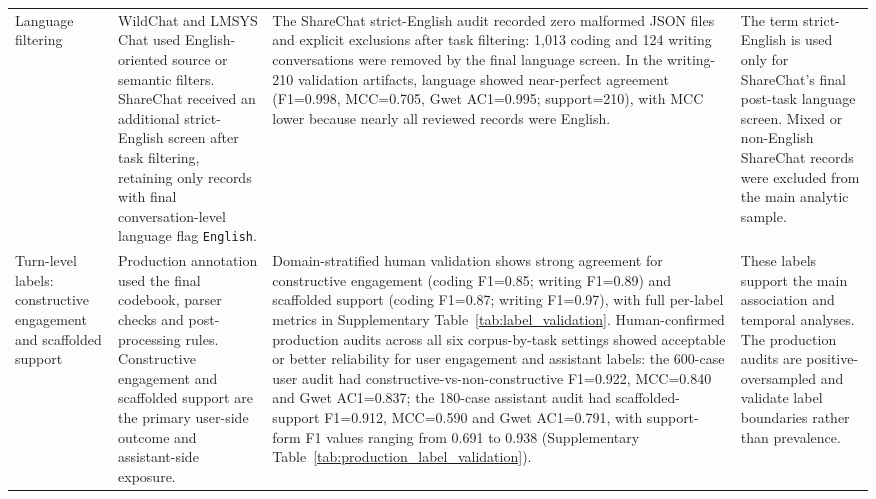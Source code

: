 \begin{table}
\begin{tabularx}{\textheight}{>{\raggedright\arraybackslash}p{0.15\textheight}>{\raggedright\arraybackslash}p{0.24\textheight}>{\raggedright\arraybackslash}p{0.25\textheight}>{\raggedright\arraybackslash}X}
\addlinespace
Language filtering & WildChat and LMSYS Chat used English-oriented source or semantic filters. ShareChat received an additional strict-English screen after task filtering, retaining only records with final conversation-level language flag \texttt{English}. & The ShareChat strict-English audit recorded zero malformed JSON files and explicit exclusions after task filtering: 1,013 coding and 124 writing conversations were removed by the final language screen. In the writing-210 validation artifacts, language showed near-perfect agreement (F1=0.998, MCC=0.705, Gwet AC1=0.995; support=210), with MCC lower because nearly all reviewed records were English. & The term strict-English is used only for ShareChat's final post-task language screen. Mixed or non-English ShareChat records were excluded from the main analytic sample. \\
\addlinespace
Turn-level labels: constructive engagement and scaffolded support & Production annotation used the final codebook, parser checks and post-processing rules. Constructive engagement and scaffolded support are the primary user-side outcome and assistant-side exposure. & Domain-stratified human validation shows strong agreement for constructive engagement (coding F1=0.85; writing F1=0.89) and scaffolded support (coding F1=0.87; writing F1=0.97), with full per-label metrics in Supplementary Table~\ref{tab:label_validation}. Human-confirmed production audits across all six corpus-by-task settings showed acceptable or better reliability for user engagement and assistant labels: the 600-case user audit had constructive-vs-non-constructive F1=0.922, MCC=0.840 and Gwet AC1=0.837; the 180-case assistant audit had scaffolded-support F1=0.912, MCC=0.590 and Gwet AC1=0.791, with support-form F1 values ranging from 0.691 to 0.938 (Supplementary Table~\ref{tab:production_label_validation}). & These labels support the main association and temporal analyses. The production audits are positive-oversampled and validate label boundaries rather than prevalence. \\
\bottomrule
\end{tabularx}
\end{table}
